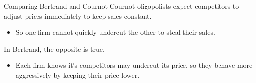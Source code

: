 \documentclass[11pt,t]{beamer}
\begin{document}
\begin{frame}{Comparing Bertrand and Cournot}
  Cournot oligopolists expect competitors to adjust prices immediately to keep sales constant.

  \begin{itemize}
    \item So one firm cannot quickly undercut the other to steal their sales.
  \end{itemize}
  
  \bigskip
  In Bertrand, the opposite is true.

  \begin{itemize}
    \item Each firm knows it's competitors may undercut its price, so they behave more aggressively by keeping their price lower.
  \end{itemize}
\end{frame}
\end{document}

